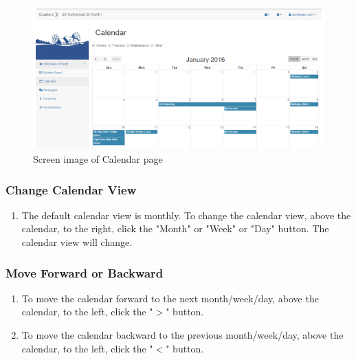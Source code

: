 \documentclass[12pt]{article}
\begin{document}
\begin{figure}
\centering
\includegraphics[width=\textwidth]{calendar}
\caption{Screen image of Calendar page}
\label{fig:calendar}
\end{figure}

\subsubsection{Change Calendar View}
\begin{enumerate}
\item The default calendar view is monthly. To change the calendar view, above the calendar, to the right, click the "Month" or "Week" or "Day" button. The calendar view will change.
\end{enumerate}

\subsubsection{Move Forward or Backward}
\begin{enumerate}
\item To move the calendar forward to the next month/week/day,  above the calendar, to the left, click the "$>$" button.
\item To move the calendar backward to the previous month/week/day,  above the calendar, to the left, click the "$<$" button.
\end{enumerate}
\end{document}
